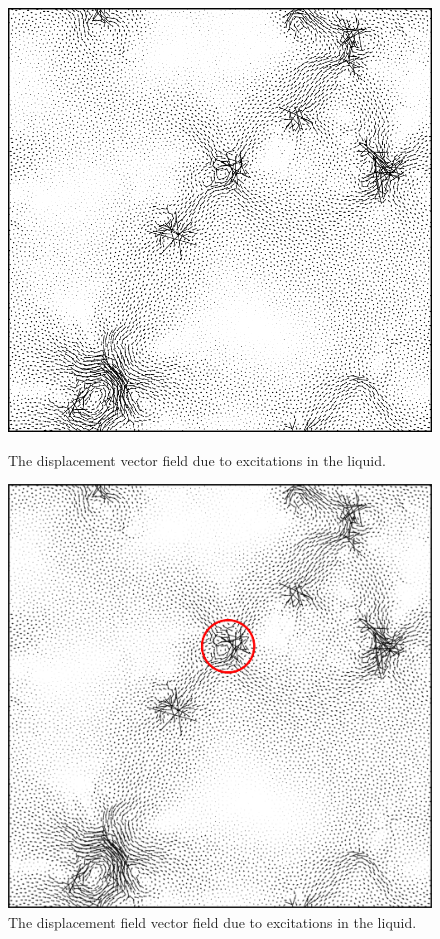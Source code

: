 \begin{frame}[c]
\begin{columns}[T]
\begin{column}[T]{0.4\textwidth}
\begin{figure}[t]
\begin{overprint}
\centering\includegraphics[width=0.85\linewidth]{b.1-exc_pureshear/zoomout_dispvector.png}\caption{The displacement vector field due to excitations in the liquid.}

\centering\includegraphics[width=0.85\linewidth]{b.1-exc_pureshear/zoomout_dispvector_1.png}\caption{The displacement field vector field due to excitations in the liquid.}


\end{overprint}
\end{figure}
\end{column}
\end{columns}
\end{frame}
